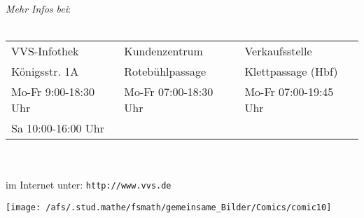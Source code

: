 
{\it Mehr Infos bei}:\\
\\
\begin{tabular}{|l|l|l|}
\hline
VVS-Infothek & Kundenzentrum & Verkaufsstelle \\
Königsstr. 1A & Rotebühlpassage & Klettpassage (Hbf)  \\
Mo-Fr  9:00-18:30 Uhr & Mo-Fr 07:00-18:30 Uhr & Mo-Fr 07:00-19:45 Uhr \\
Sa 10:00-16:00 Uhr & & \\
\hline
\end{tabular}\\
\\
im Internet unter: \verb|http://www.vvs.de|

\newpage
\vspace*{5cm}
\begin{center}
\texttt{[image: /afs/.stud.mathe/fsmath/gemeinsame\_Bilder/Comics/comic10]}
\end{center}

